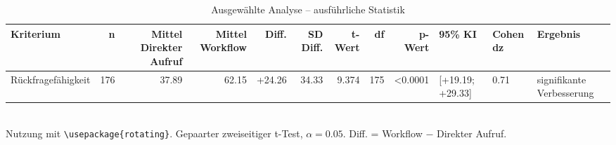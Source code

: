 \begin{table}
\centering
\caption{Ausgewählte Analyse -- ausführliche Statistik}
\begin{tabular}{lrrrrrrrrlll}
\toprule
Kriterium & n & Mittel Direkter Aufruf & Mittel Workflow & Diff. & SD Diff. & t-Wert & df & p-Wert & 95\% KI & Cohen dz & Ergebnis \\
\midrule
Rückfragefähigkeit & 176 & 37.89 & 62.15 & +24.26 & 34.33 & 9.374 & 175 & <0.0001 & [+19.19; +29.33] & 0.71 & signifikante Verbesserung \\
\bottomrule
\end{tabular}
\\[2mm]
\footnotesize Nutzung mit \texttt{\textbackslash usepackage\{rotating\}}. Gepaarter zweiseitiger t-Test, $\alpha=0.05$. Diff. = Workflow $-$ Direkter Aufruf.
\end{table}

